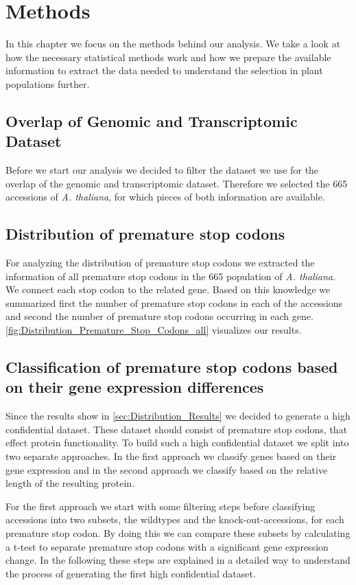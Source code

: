 \chapter{Methods}
In this chapter we focus on the methods behind our analysis. We take a look at how the necessary statistical methods work and how we prepare the available information to extract the data needed to understand the selection in plant populations further. 
\section{Overlap of Genomic and Transcriptomic Dataset}
Before we start our analysis we decided to filter the dataset we use for the overlap of the genomic and transcriptomic dataset. Therefore we selected the 665 accessions of \textit{A. thaliana}, for which pieces of both information are available.
\section{Distribution of premature stop codons}
For analyzing the distribution of premature stop codons we extracted the information of all premature stop codons in the 665 population of \textit{A. thaliana}. We connect each stop codon to the related gene. Based on this knowledge we summarized first the number of premature stop codons in each of the accessions and second the number of premature stop codons occurring in each gene. \autoref{fig:Distribution_Premature_Stop_Codons_all} visualizes our results.
\section{Classification of premature stop codons based on their gene expression differences} 
\label{sec:Methods_Approach_Gene_Expression}
Since the results show in \autoref{sec:Distribution_Results} we decided to generate a high confidential dataset. These dataset should consist of premature stop codons, that effect protein functionality. To build such a high confidential dataset we split into two separate approaches. In the first approach we classify genes based on their gene expression and in the second approach we classify based on the relative length of the resulting protein. 

For the first approach we start with some filtering steps before classifying accessions into two subsets, the wildtypes and the knock-out-accessions, for each premature stop codon. By doing this we can compare these subsets by calculating a t-test to separate premature stop codons with a significant gene expression change. In the following these steps are explained in a detailed way to understand the process of generating the first high confidential dataset. 
